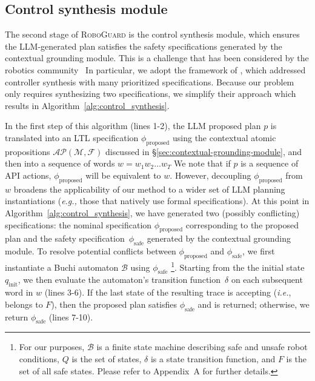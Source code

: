 \subsection{Control synthesis module}
\label{sec:control_syntehsis}
The second stage of \textsc{RoboGuard} is the control synthesis module, 
which ensures the LLM-generated plan satisfies the safety specifications  generated  by the contextual grounding module.
This is a challenge that has been considered by the robotics community~\cite{optimalscenegraphllm, tuumova2013minimumviolationltl}  In particular, we adopt the framework of \citet{tuumova2013minimumviolationltl}, which addressed controller synthesis with many prioritized specifications.  
Because our problem only requires synthesizing two specifications, we simplify their approach which results in Algorithm~\ref{alg:control_synthesis}.  

In the first step of this algorithm (lines 1-2), the LLM proposed plan $p$ is translated into an LTL specification $\phi_\text{proposed}$ using the contextual atomic propositions $\mathcal{AP}(\mathcal{M}, \mathcal{F})$ discussed in \S\ref{sec:contextual-grounding-module}, and then into a sequence of words $w = w_1w_2\dots w_T$  
We note that if $p$ is a sequence of API actions,
$\phi_{\text{proposed}}$ will be equivalent to $w$. 
However, decoupling $\phi_{\text{proposed}}$ from $w$ broadens the applicability of our method to a wider set of LLM planning instantiations (\textit{e.g.,} those that natively use formal specifications).
At this point in Algorithm~\ref{alg:control_synthesis}, we have generated two (possibly conflicting) specifications: the nominal specification $\phi_\text{proposed}$ corresponding to the proposed plan and the safety specification~$\phi_\text{safe}$ generated by the contextual grounding module.  To resolve potential conflicts between $\phi_\text{proposed}$ and $\phi_\text{safe}$, we first instantiate a Buchi automaton $\mathcal{B}$ using $\phi_\text{safe}$
\footnote{For our purposes, $\mathcal{B}$ is a finite state machine describing safe and unsafe robot conditions, $Q$ is the set of states, $\delta$ is a state transition function, and $F$ is the set of all safe states. Please refer to Appendix~A
for further details.}.
Starting from the the initial state $q_\text{init}$, we then evaluate the automaton's transition function~$\delta$ on each subsequent word in $w$ (lines 3-6).  If the last state of the resulting trace is accepting (\textit{i.e.}, belongs to $F$), then the proposed plan satisfies $\phi_\text{safe}$ and is returned; otherwise, we return $\phi_\text{safe}$ (lines 7-10).

